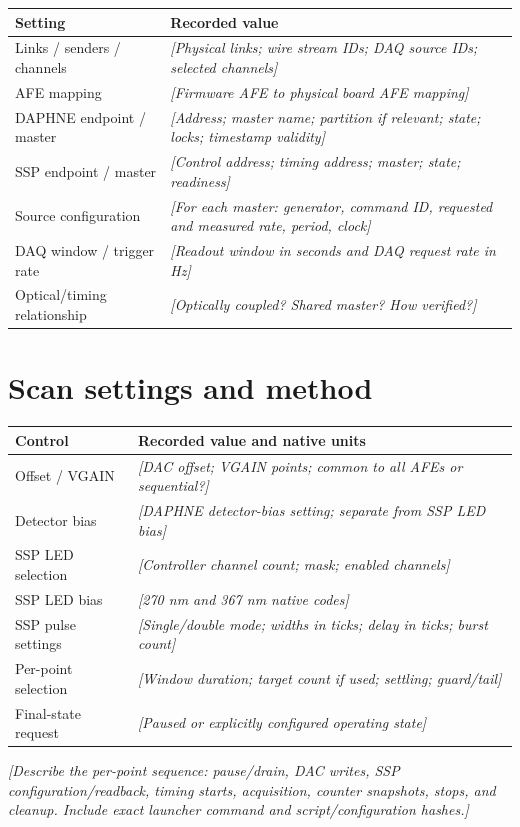 \documentclass[11pt,a4paper]{article}
\newcommand{\entry}[1]{\textcolor{blue!60!black}{\textit{[#1]}}}
\begin{document}
\begin{tabularx}{\linewidth}{@{}lX@{}}\toprule
Setting & Recorded value \\\midrule
Links / senders / channels & \entry{Physical links; wire stream IDs; DAQ source IDs; selected channels} \\
AFE mapping & \entry{Firmware AFE to physical board AFE mapping} \\
DAPHNE endpoint / master & \entry{Address; master name; partition if relevant; state; locks; timestamp validity} \\
SSP endpoint / master & \entry{Control address; timing address; master; state; readiness} \\
Source configuration & \entry{For each master: generator, command ID, requested and measured rate, period, clock} \\
DAQ window / trigger rate & \entry{Readout window in seconds and DAQ request rate in Hz} \\
Optical/timing relationship & \entry{Optically coupled? Shared master? How verified?} \\\bottomrule
\end{tabularx}

\section{Scan settings and method}
\begin{tabularx}{\linewidth}{@{}lX@{}}\toprule
Control & Recorded value and native units \\\midrule
Offset / VGAIN & \entry{DAC offset; VGAIN points; common to all AFEs or sequential?} \\
Detector bias & \entry{DAPHNE detector-bias setting; separate from SSP LED bias} \\
SSP LED selection & \entry{Controller channel count; mask; enabled channels} \\
SSP LED bias & \entry{270 nm and 367 nm native codes} \\
SSP pulse settings & \entry{Single/double mode; widths in ticks; delay in ticks; burst count} \\
Per-point selection & \entry{Window duration; target count if used; settling; guard/tail} \\
Final-state request & \entry{Paused or explicitly configured operating state} \\\bottomrule
\end{tabularx}

\entry{Describe the per-point sequence: pause/drain, DAC writes, SSP configuration/readback, timing starts, acquisition, counter snapshots, stops, and cleanup. Include exact launcher command and script/configuration hashes.}
\end{document}
